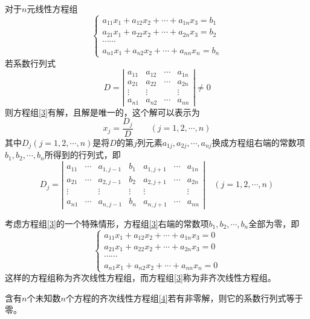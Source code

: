 \begin{theorem}[克莱姆法则]
  对于$n$元线性方程组
    \begin{equation}\label{3}
      \left\{\begin{array}{l}
        a_{11} x_{1}+a_{12} x_{2}+\cdots+a_{1n} x_{3}=b_{1} \\
        a_{21} x_{1}+a_{22} x_{2}+\cdots+a_{2n} x_{3}=b_{2} \\
        \cdots\cdots\\
        a_{n1} x_{1}+a_{n2} x_{2}+\cdots+a_{nn} x_{n}=b_{n}
        \end{array}\right.
    \end{equation}
    若系数行列式
    $$
    D=\left|\begin{array}{cccc}
    a_{11} & a_{12} & \cdots & a_{1 n} \\
    a_{21} & a_{22} & \cdots & a_{2 n} \\
    \vdots & \vdots & & \vdots \\
    a_{n 1} & a_{n 2} & \cdots & a_{n n}
    \end{array}\right| \neq 0
    $$
    则方程组\eqref{3}有解，且解是唯一的，这个解可以表示为
    $$x_j=\frac{D_j}{D}\qquad(j=1,2,\cdots,n)$$
    其中$D_j(j=1,2,\cdots,n)$是将$D$的第$j$列元素$a_{1j},a_{2j},\cdots,a_{nj}$换成方程组右端的常数项
    $b_1,b_2,\cdots,b_n$所得到的行列式，即
    $$
    D_{j}=\left|\begin{array}{ccccccc}
    a_{11} & \cdots & a_{1, j-1} & b_{1} & a_{1, j+1} & \cdots & a_{1 n} \\
    a_{21} & \cdots & a_{2, j-1} & b_{2} & a_{2, j+1} & \cdots & a_{2 n} \\
    \vdots & & \vdots & \vdots & \vdots & & \vdots \\
    a_{n 1} & \cdots & a_{n, j-1} & b_{n} & a_{n, j+1} & \cdots & a_{n n}
    \end{array}\right| \quad(j=1,2, \cdots, n)
    $$

    考虑方程组\eqref{3}的一个特殊情形，方程组\eqref{3}右端的常数项$b_1,b_2,\cdots,b_n$全部为零，即
    \begin{equation}\label{4}   
    \left\{\begin{array}{l}
      a_{11} x_{1}+a_{12} x_{2}+\cdots+a_{1n} x_{3}=0 \\
      a_{21} x_{1}+a_{22} x_{2}+\cdots+a_{2n} x_{3}=0\\
      \cdots\cdots\\
      a_{n1} x_{1}+a_{n2} x_{2}+\cdots+a_{nn} x_{n}=0
      \end{array}\right.
    \end{equation}
      这样的方程组称为{\heiti 齐次线性方程组}，而方程组\eqref{3}称为{\heiti 非齐次线性方程组}。
\end{theorem}

\begin{theorem}
  含有$n$个未知数$n$个方程的齐次线性方程组\eqref{4}若有非零解，则它的系数行列式等于零。
\end{theorem}
